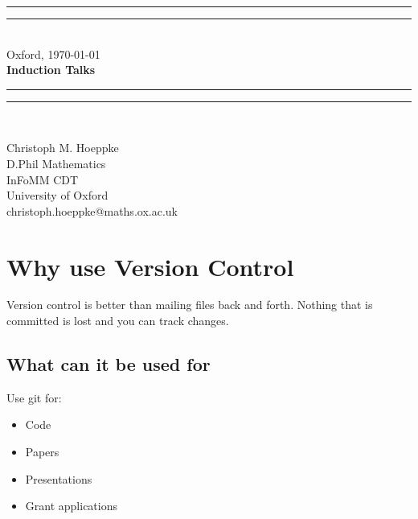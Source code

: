 \documentclass[a4paper,10pt]{scrartcl}
\author{Christoph Höppke}
\date{\today}
\begin{document}
\pagestyle{empty}
\begin{center} \vspace{4ex}
    \rule{\textwidth}{1.6pt}\vspace*{-\baselineskip}\vspace*{2pt} %
    \rule{\textwidth}{0.4pt}\\[\baselineskip]  %
    \large{Oxford, \today}\\ \vspace{2ex}
    \textbf{\Large{Induction Talks}}\\
    \rule{\textwidth}{0.4pt}\vspace*{-\baselineskip}\vspace{3.2pt} %
    \rule{\textwidth}{1.6pt}\\[\baselineskip] %
    \vspace{2ex}
\end{center}
\vfill
\begin{flushright}
    \begin{minipage}[h]{0.3\textwidth}
        \begin{normalsize}
            Christoph M. Hoeppke\\
            D.Phil Mathematics\\
            InFoMM CDT\\
            University of Oxford\\
            christoph.hoeppke@maths.ox.ac.uk
        \end{normalsize}
    \end{minipage}
\end{flushright}
\pagebreak
\newpage
\tableofcontents
\newpage
\pagestyle{plain}
\setcounter{page}{1}
\section{Why use Version Control}
Version control is better than mailing files back and forth.
Nothing that is committed is lost and you can track changes.

\subsection{What can it be used for}%
\label{sub:what_can_it_be_used_for}
Use git for:
\begin{itemize}
    \item Code
    \item Papers
    \item Presentations
    \item Grant applications
\end{itemize}
\end{document}
